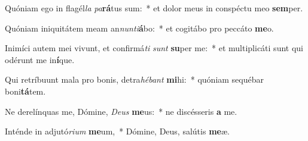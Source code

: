 \item Quóniam ego in flagél\textit{la} \textit{pa}\textbf{rá}tus sum:~* et dolor meus in conspéctu meo \textbf{sem}per.
\item Quóniam iniquitátem meam an\textit{nun}\textit{ti}\textbf{á}bo:~* et cogitábo pro peccáto \textbf{me}o.
\item Inimíci autem mei vivunt, et confirmá\textit{ti} \textit{sunt} \textbf{su}per me:~* et multiplicáti sunt qui odérunt me in\textbf{í}que.
\item Qui retríbuunt mala pro bonis, detra\textit{hé}\textit{bant} \textbf{mi}hi:~* quóniam sequébar boni\textbf{tá}tem.
\item Ne derelínquas me, Dómine, \textit{De}\textit{us} \textbf{me}us:~* ne discésseris \textbf{a} me.
\item Inténde in adjutó\textit{ri}\textit{um} \textbf{me}um,~* Dómine, Deus, salútis \textbf{me}æ.
